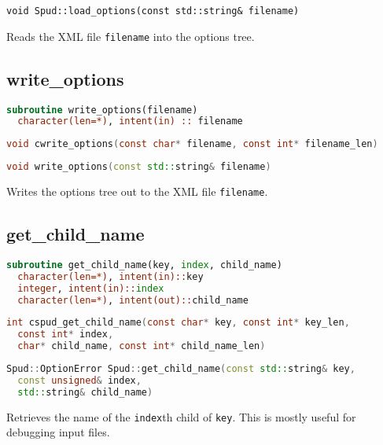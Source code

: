 \documentclass[a4paper, 11pt]{book}
\begin{document}
\begin{lstlisting}
void Spud::load_options(const std::string& filename)
\end{lstlisting}

Reads the XML file \lstinline+filename+ into the options tree.

\subsection{write\_options}

\begin{lstlisting}[language=fortran]
subroutine write_options(filename)
  character(len=*), intent(in) :: filename
\end{lstlisting}

\begin{lstlisting}[language=C]
void cwrite_options(const char* filename, const int* filename_len)
\end{lstlisting}

\begin{lstlisting}[language=C++]
void write_options(const std::string& filename)
\end{lstlisting}

Writes the options tree out to the XML file \lstinline+filename+.

\subsection{get\_child\_name}

\begin{lstlisting}[language=fortran]
subroutine get_child_name(key, index, child_name)
  character(len=*), intent(in)::key
  integer, intent(in)::index
  character(len=*), intent(out)::child_name
\end{lstlisting}

\begin{lstlisting}[language=C]
int cspud_get_child_name(const char* key, const int* key_len,
  const int* index,
  char* child_name, const int* child_name_len)
\end{lstlisting}

\begin{lstlisting}[language=C++]
Spud::OptionError Spud::get_child_name(const std::string& key,
  const unsigned& index,
  std::string& child_name)
\end{lstlisting}

Retrieves the name of the \lstinline+index+th child of \lstinline+key+. This
is mostly useful for debugging input files.
\end{document}
